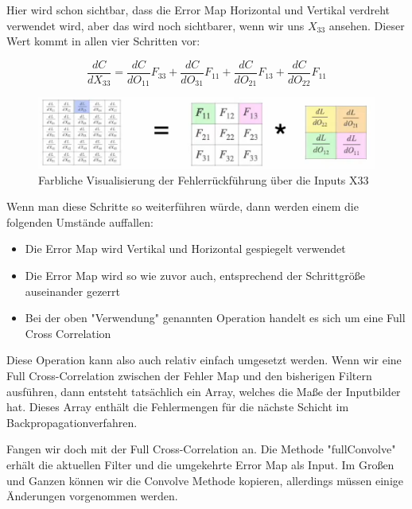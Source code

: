 \documentclass[12pt]{article}
\begin{document}
Hier wird schon sichtbar, dass die Error Map Horizontal und Vertikal verdreht verwendet wird, aber das wird noch sichtbarer, wenn wir uns $X_{33}$ ansehen. Dieser Wert kommt in allen vier Schritten vor:

$$\frac {dC} {dX_{33}} = \frac {dC}{dO_{11}} F_{33} + \frac {dC}{dO_{31}} F_{11} + \frac {dC}{dO_{21}} F_{13} + \frac {dC}{dO_{22}} F_{11}$$

\begin{figure}[H]
\centering
\includegraphics[scale=0.80]{Images/TemporaryPlaceholders/Farbliche Visualisierung der Fehlerrückführung über die Inputs X31.png}
\caption{Farbliche Visualisierung der Fehlerrückführung über die Inputs X33}
\label{Farbliche Visualisierung der Fehlerrückführung über die Inputs X33}
\end{figure}

Wenn man diese Schritte so weiterführen würde, dann werden einem die folgenden Umstände auffallen:
\begin{itemize}
  \item Die Error Map wird Vertikal und Horizontal gespiegelt verwendet
  \item Die Error Map wird so wie zuvor auch, entsprechend der Schrittgröße auseinander gezerrt  
  \item Bei der oben "Verwendung" genannten Operation handelt es sich um eine Full Cross Correlation
\end{itemize}

Diese Operation kann also auch relativ einfach umgesetzt werden. Wenn wir eine Full Cross-Correlation zwischen der Fehler Map und den bisherigen Filtern ausführen, dann entsteht tatsächlich ein Array, welches die Maße der Inputbilder hat. Dieses Array enthält die Fehlermengen für die nächste Schicht im Backpropagationverfahren. 

Fangen wir doch mit der Full Cross-Correlation an. Die Methode "fullConvolve" erhält die aktuellen Filter und die umgekehrte Error Map als Input. Im Großen und Ganzen können wir die Convolve Methode kopieren, allerdings müssen einige Änderungen vorgenommen werden.
\end{document}
